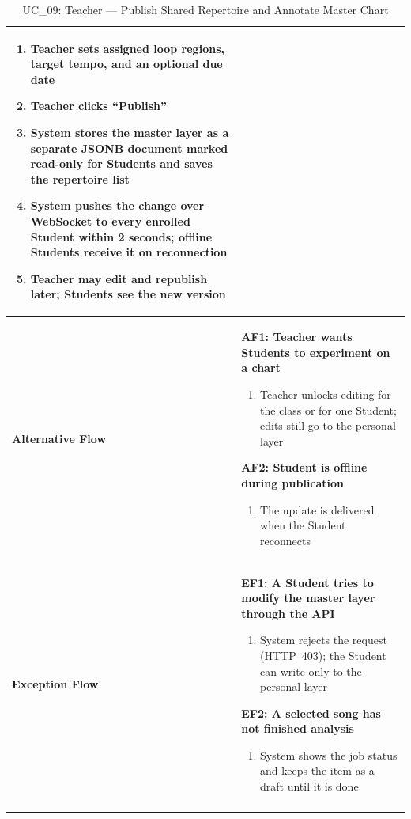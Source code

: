 \documentclass[a4paper]{article}
\newlength{\ucLeft}
\begin{document}
\begin{longtable}{|>{\bfseries}p{\ucLeft}|p{\dimexpr\linewidth-\ucLeft-2\tabcolsep-2\arrayrulewidth}|}
\begin{enumerate}[leftmargin=1.5em, nosep, topsep=2pt, partopsep=0pt, parsep=0pt, after=\strut]
    \item Teacher sets assigned loop regions, target tempo, and an optional due date
    \item Teacher clicks ``Publish''
    \item System stores the master layer as a separate JSONB document marked read-only for Students and saves the repertoire list
    \item System pushes the change over WebSocket to every enrolled Student within 2 seconds; offline Students receive it on reconnection
    \item Teacher may edit and republish later; Students see the new version
\end{enumerate}
\\ \hline
Alternative Flow &
\textbf{AF1: Teacher wants Students to experiment on a chart}
\begin{enumerate}[leftmargin=1.5em, nosep, topsep=2pt, partopsep=0pt, parsep=0pt, after=\strut]
    \item Teacher unlocks editing for the class or for one Student; edits still go to the personal layer
\end{enumerate}
\textbf{AF2: Student is offline during publication}
\begin{enumerate}[leftmargin=1.5em, nosep, topsep=2pt, partopsep=0pt, parsep=0pt, after=\strut]
    \item The update is delivered when the Student reconnects
\end{enumerate}
\\ \hline
Exception Flow &
\textbf{EF1: A Student tries to modify the master layer through the API}
\begin{enumerate}[leftmargin=1.5em, nosep, topsep=2pt, partopsep=0pt, parsep=0pt, after=\strut]
    \item System rejects the request (HTTP~403); the Student can write only to the personal layer
\end{enumerate}
\textbf{EF2: A selected song has not finished analysis}
\begin{enumerate}[leftmargin=1.5em, nosep, topsep=2pt, partopsep=0pt, parsep=0pt, after=\strut]
    \item System shows the job status and keeps the item as a draft until it is done
\end{enumerate}
\\ \hline
\caption{UC\_09: Teacher --- Publish Shared Repertoire and Annotate Master Chart}\label{tab:uc09_repertoire}
\end{longtable}
\end{document}
